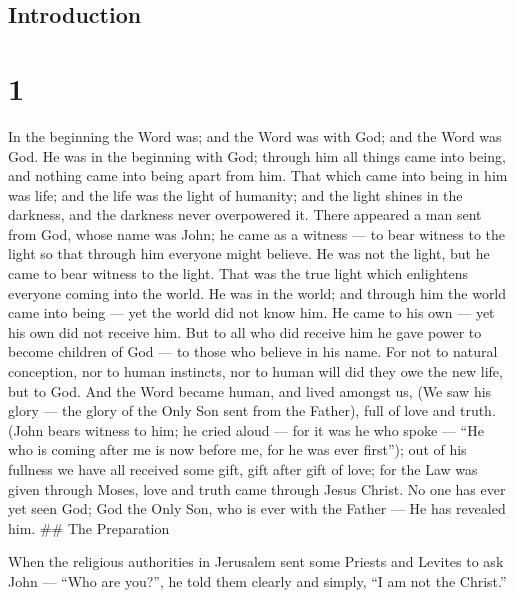 \hypertarget{introduction}{%
\subsection{Introduction}\label{introduction}}

\hypertarget{section}{%
\section{1}\label{section}}

 In the beginning the Word was; and the Word was with God;
and the Word was God.  He was in the beginning with God;
 through him all things came into being, and nothing came
into being apart from him.  That which came into being in
him was life; and the life was the light of humanity;  and
the light shines in the darkness, and the darkness never overpowered it.
 There appeared a man sent from God, whose name was John;
 he came as a witness --- to bear witness to the light so
that through him everyone might believe.  He was not the
light, but he came to bear witness to the light.  That was
the true light which enlightens everyone coming into the world.
 He was in the world; and through him the world came into
being --- yet the world did not know him.  He came to his
own --- yet his own did not receive him.  But to all who
did receive him he gave power to become children of God --- to those who
believe in his name.  For not to natural conception, nor to
human instincts, nor to human will did they owe the new life, but to
God.  And the Word became human, and lived amongst us, (We
saw his glory --- the glory of the Only Son sent from the Father), full
of love and truth.  (John bears witness to him; he cried
aloud --- for it was he who spoke --- ``He who is coming after me is now
before me, for he was ever first'');  out of his fullness
we have all received some gift, gift after gift of love; 
for the Law was given through Moses, love and truth came through Jesus
Christ.  No one has ever yet seen God; God the Only Son,
who is ever with the Father --- He has revealed him. \#\# The
Preparation

 When the religious authorities in Jerusalem sent some
Priests and Levites to ask John --- ``Who are you?'',  he
told them clearly and simply, ``I am not the Christ.''

